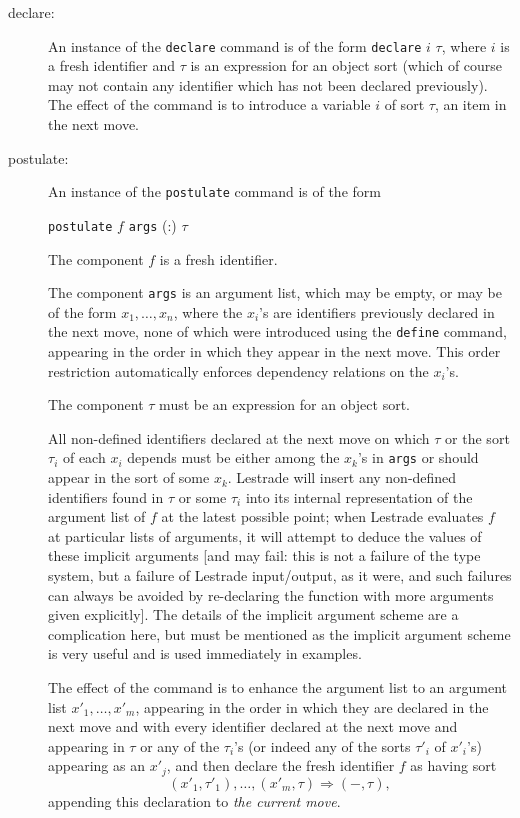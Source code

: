 \documentclass[12pt]{article}
\begin{document}
\begin{description}

\item[declare:] An instance of the {\tt declare} command is of the form {\tt declare} $i$ $\tau$, where $i$ is a fresh identifier and $\tau$ is an expression for an object sort (which of course may not contain any identifier which has not been declared previously).  The effect of the command is to introduce a variable $i$ of sort $\tau$, an item in the next move.

\item[postulate:] An instance of the {\tt postulate} command is of the form 

{\tt postulate} $f$ {\tt args} (:) $\tau$

The component $f$ is a fresh identifier.

The component {\tt args} is an argument list, which may be empty, or may be of the form $x_1,\ldots,x_n$, where the $x_i$'s are identifiers previously declared in the next move, none of which were introduced using the {\tt define} command, appearing in the order in which they appear in the next move.  This order restriction automatically enforces dependency relations
on the $x_i$'s.  

The component $\tau$ must be an expression for an object sort.  

All non-defined identifiers declared at the next move on which $\tau$ or the sort $\tau_i$ of each $x_i$ depends must be either among the $x_k$'s in {\tt args} or should appear in the sort of some $x_k$.  Lestrade will insert any non-defined identifiers found in $\tau$ or some $\tau_i$ into its internal representation of the argument list of $f$ at the latest possible point;  when Lestrade evaluates $f$ at particular lists of arguments, it will attempt to deduce the values of these implicit arguments [and may fail:  this is not a failure of the type system, but a failure of Lestrade input/output, as it were, and such failures can always be avoided by re-declaring the function with more arguments given explicitly].  The details of the implicit argument scheme are a complication here, but must be mentioned as the implicit argument scheme is very useful and is used immediately in examples.

The effect of the command is to enhance the argument list
to an argument list $x'_1,\ldots,x'_m$, appearing in the order in which they are declared in the next move and with every identifier declared at the next
move and appearing in $\tau$ or any of the $\tau_i$'s (or indeed any of the sorts $\tau'_i$ of $x'_i$'s) appearing as an $x'_j$, and then declare the fresh identifier $f$
as having sort $$(x'_1,\tau'_1),\ldots,(x'_m,\tau)\Rightarrow (-,\tau),$$ appending this declaration to {\em the current move\/}.    


\end{description}
\end{document}

